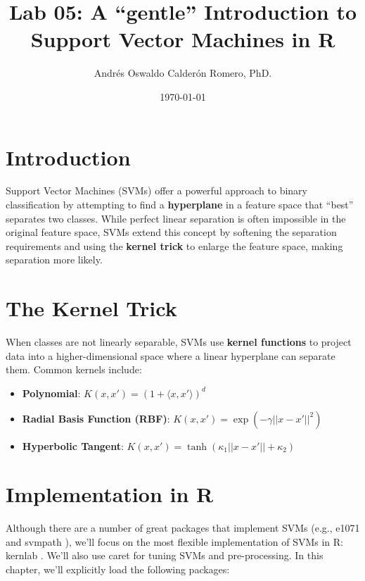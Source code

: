 \documentclass{article}
\title{Lab 05: A ``gentle'' Introduction to Support Vector Machines in R}
\author{Andrés Oswaldo Calderón Romero, PhD.}
\date{\today}
\begin{document}
\maketitle

\section{Introduction}
Support Vector Machines (SVMs) offer a powerful approach to binary classification by attempting to find a \textbf{hyperplane} in a feature space that ``best'' separates two classes. While perfect linear separation is often impossible in the original feature space, SVMs extend this concept by softening the separation requirements and using the \textbf{kernel trick} to enlarge the feature space, making separation more likely.

\section{The Kernel Trick}
When classes are not linearly separable, SVMs use \textbf{kernel functions} to project data into a higher-dimensional space where a linear hyperplane can separate them. Common kernels include:

\begin{itemize}
    \item \textbf{Polynomial}: $K(x, x') = (1 + \langle x, x' \rangle)^d$

    \item \textbf{Radial Basis Function (RBF)}: $K(x, x') = \exp(-\gamma ||x - x'||^2)$

    \item \textbf{Hyperbolic Tangent}: $K(x, x') = \tanh(\kappa_1 ||x - x'|| + \kappa_2)$
\end{itemize}

\section{Implementation in R}
Although there are a number of great packages that implement SVMs (e.g., e1071 \parencite{meyer2019e1071} and svmpath \parencite{hastie2016svmpath}), we’ll focus on the most flexible implementation of SVMs in R: kernlab \parencite{karatzoglou2004kernlab}. We’ll also use caret for tuning SVMs and pre-processing. In this chapter, we’ll explicitly load the following packages:
\end{document}
